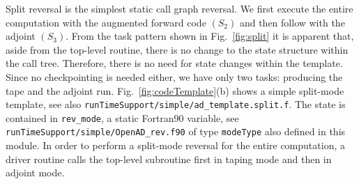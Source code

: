 \documentclass{book}
\newcommand{\reffig}[1]{{Fig.~\ref{#1}}}
\begin{document}
Split reversal is the simplest static call graph reversal. We first execute the entire computation 
with the augmented forward code $(S_2)$ and then 
follow with the adjoint $(S_3)$. 
From the task pattern 
shown in \reffig{fig:split} it is 
apparent that, aside from the top-level routine, there is 
no change to the state structure within the call tree.
Therefore, there is no need for state changes within the template. 
Since no checkpointing is needed either, we have only two tasks: 
producing the tape and the adjoint run.
\reffig{fig:codeTemplate}(b) shows a simple split-mode template, see also \lstinline{runTimeSupport/simple/ad_template.split.f}.
The state is contained in \lstinline{rev_mode}, a static Fortran90 variable, see \lstinline{runTimeSupport/simple/OpenAD_rev.f90}
of type \lstinline{modeType} also defined in this module.  
In order to perform a split-mode reversal for the entire computation, a driver routine 
calls the top-level subroutine first in taping mode and then in adjoint mode.
\end{document}
